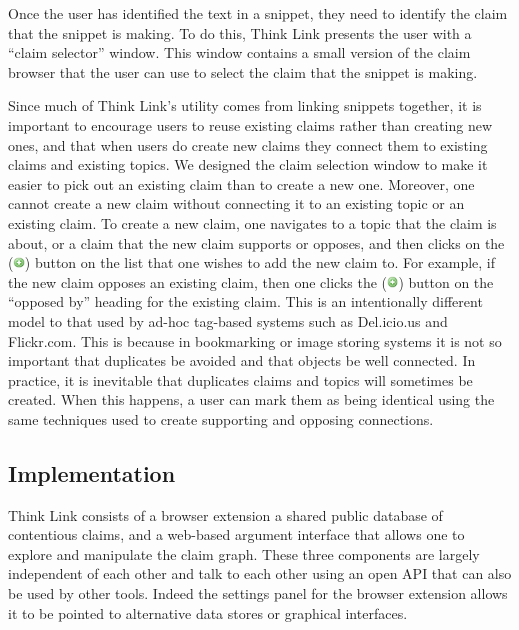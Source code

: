 \documentclass{chi2009}
\begin{document}
Once the user has identified the text in a snippet, they need to identify the claim that the snippet is making. To do this, Think Link presents the user with a ``claim selector'' window. This window contains a small version of the claim browser that the user can use to select the claim that the snippet is making. 

Since much of Think Link's utility comes from linking snippets together, it is important to encourage users to reuse existing claims rather than creating new ones, and that when users do create new claims they connect them to existing claims and existing topics. We designed the claim selection window to make it easier to pick out an existing claim than to create a new one. Moreover, one cannot create a new claim without connecting it to an existing topic or an existing claim. To create a new claim, one navigates to a topic that the claim is about, or a claim that the new claim supports or opposes, and then clicks on the (\includegraphics[width=0.3cm]{../images/add.png}) button on the list that one wishes to add the new claim to. For example, if the new claim opposes an existing claim, then one clicks the (\includegraphics[width=0.3cm]{../images/add.png}) button on the ``opposed by'' heading for the existing claim. This is an intentionally different model to that used by ad-hoc tag-based systems such as Del.icio.us and Flickr.com. This is because in bookmarking or image storing systems it is not so important that duplicates be avoided and that objects be well connected. In practice, it is inevitable that duplicates claims and topics will sometimes be created. When this happens, a user can mark them as being identical using the same techniques used to create supporting and opposing connections.



\subsection{Implementation}

Think Link consists of a browser extension a shared public database of contentious claims, and a web-based argument interface that allows one to explore and manipulate the claim graph. These three components are largely independent of each other and talk to each other using an open API that can also be used by other tools. Indeed the settings panel for the browser extension allows it to be pointed to alternative data stores or graphical interfaces.
\end{document}
